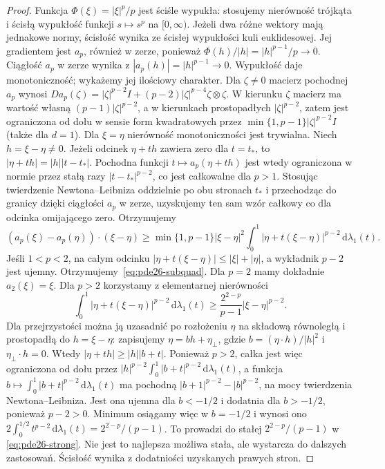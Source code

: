 \begin{proof}
Funkcja $\Phi(\xi)=|\xi|^p/p$ jest ściśle wypukła:
stosujemy nierówność trójkąta i ścisłą wypukłość
funkcji $s\mapsto s^p$ na $[0,\infty)$. Jeżeli
dwa różne wektory mają jednakowe normy, ścisłość
wynika ze ścisłej wypukłości kuli euklidesowej.
Jej gradientem jest $a_p$, również w zerze,
ponieważ $\Phi(h)/|h|=|h|^{p-1}/p\to0$.
Ciągłość $a_p$ w zerze wynika z
$|a_p(h)|=|h|^{p-1}\to0$.
Wypukłość daje monotoniczność; wykażemy jej
ilościowy charakter.
Dla $\zeta\ne0$ macierz pochodnej $a_p$ wynosi
$Da_p(\zeta)=|\zeta|^{p-2}I+(p-2)|\zeta|^{p-4}\zeta\otimes\zeta$.
W kierunku $\zeta$ macierz ma wartość własną
$(p-1)|\zeta|^{p-2}$, a w kierunkach prostopadłych
$|\zeta|^{p-2}$, zatem jest ograniczona od dołu
w sensie form kwadratowych przez
$\min\{1,p-1\}|\zeta|^{p-2}I$ (także dla $d=1$).
Dla $\xi=\eta$ nierówność monotoniczności jest trywialna.
Niech $h=\xi-\eta\ne0$. Jeżeli odcinek
$\eta+th$ zawiera zero dla $t=t_*$, to
$|\eta+th|=|h||t-t_*|$. Pochodna funkcji
$t\mapsto a_p(\eta+th)$ jest wtedy ograniczona
w normie przez stałą razy $|t-t_*|^{p-2}$,
co jest całkowalne dla $p>1$.
Stosując twierdzenie Newtona--Leibniza oddzielnie
po obu stronach $t_*$ i przechodząc do granicy
dzięki ciągłości $a_p$ w zerze, uzyskujemy ten sam
wzór całkowy co dla odcinka omijającego zero.
Otrzymujemy
\[
 (a_p(\xi)-a_p(\eta))\cdot(\xi-\eta)
 \ge \min\{1,p-1\}|\xi-\eta|^2
 \int_0^1|\eta+t(\xi-\eta)|^{p-2}\,\mathrm d\lambda_1(t).
\]
Jeśli $1<p<2$, na całym odcinku
$|\eta+t(\xi-\eta)|\le|\xi|+|\eta|$, a wykładnik
$p-2$ jest ujemny. Otrzymujemy~\eqref{eq:pde26-subquad}.
Dla $p=2$ mamy dokładnie $a_2(\xi)=\xi$.
Dla $p>2$ korzystamy z elementarnej nierówności
\[
 \int_0^1|\eta+t(\xi-\eta)|^{p-2}\,\mathrm d\lambda_1(t)
 \ge \frac{2^{2-p}}{p-1}|\xi-\eta|^{p-2}.
\]
Dla przejrzystości można ją uzasadnić po rozłożeniu
$\eta$ na składową równoległą i prostopadłą do
$h=\xi-\eta$: zapisujemy $\eta=bh+\eta_\perp$,
gdzie $b=(\eta\cdot h)/|h|^2$ i $\eta_\perp\cdot h=0$.
Wtedy $|\eta+th|\ge |h||b+t|$.
Ponieważ $p>2$, całka jest więc ograniczona od dołu
przez $|h|^{p-2}\int_0^1|b+t|^{p-2}\,\mathrm d\lambda_1(t)$,
a funkcja
$b\mapsto\int_0^1|b+t|^{p-2}\,\mathrm d\lambda_1(t)$
ma pochodną $|b+1|^{p-2}-|b|^{p-2}$,
na mocy twierdzenia Newtona--Leibniza.
Jest ona ujemna dla $b<-1/2$ i dodatnia dla
$b>-1/2$, ponieważ $p-2>0$. Minimum osiągamy
więc w $b=-1/2$ i wynosi ono
$2\int_0^{1/2}t^{p-2}\,\mathrm d\lambda_1(t)
=2^{2-p}/(p-1)$.
To prowadzi do stałej $2^{2-p}/(p-1)$ w
\eqref{eq:pde26-strong}. Nie jest to najlepsza możliwa
stała, ale wystarcza do dalszych zastosowań.
Ścisłość wynika z dodatniości uzyskanych prawych stron.
\end{proof}

